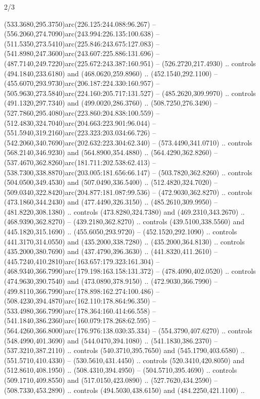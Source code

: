 \begin{flagdescription}{2/3}
\begin{scope}[xshift=0.5\flaglength,yshift=0.5\flagwidth,scale=\flagwidth/638.38]
\begin{scope}[y=0.80pt, x=0.80pt, yscale=-1,shift={(-600,-400)}]
\begin{scope}[shift={(-0.02,2.173)}]
  (533.3680,295.3750)arc(226.125:244.088:96.267) --
  (556.2060,274.7090)arc(243.994:226.135:100.638) --
  (511.5350,273.5410)arc(225.846:243.675:127.083) --
  (541.8980,247.3600)arc(243.607:225.886:131.696) --
  (487.7140,249.7220)arc(225.672:243.387:160.951) -- (526.2720,217.4930) ..
  controls (494.1840,233.6180) and (468.0620,259.8960) .. (452.1540,292.1100) --
  (455.6070,293.9730)arc(206.187:224.330:160.957) --
  (505.9630,273.5840)arc(224.160:205.717:131.527) -- (485.2620,309.9970) ..
  controls (491.1320,297.7340) and (499.0020,286.3760) .. (508.7250,276.3490) --
  (527.7860,295.4080)arc(223.860:204.838:100.559) --
  (512.4830,324.7040)arc(204.663:223.901:96.044) --
  (551.5940,319.2160)arc(223.323:203.034:66.726) --
  (542.2060,340.7690)arc(202.632:223.304:62.340) -- (573.4490,341.0710) ..
  controls (568.2140,346.9230) and (564.8900,354.4880) .. (564.4290,362.8260) --
  (537.4670,362.8260)arc(181.711:202.538:62.413) --
  (538.7300,338.8870)arc(203.005:181.656:66.147) -- (503.7820,362.8260) ..
  controls (504.0500,349.4530) and (507.0490,336.5400) .. (512.4820,324.7020) --
  (509.0340,322.8420)arc(204.877:181.087:99.536) -- (472.9030,362.8270) ..
  controls (473.1860,344.2430) and (477.4490,326.3150) .. (485.2610,309.9950) --
  (481.8220,308.1380) .. controls (473.8280,324.7380) and (469.2310,343.2670) ..
  (468.9390,362.8270) -- (439.2180,362.8270) .. controls (439.5100,338.5560) and
  (445.1820,315.1690) .. (455.6050,293.9720) -- (452.1520,292.1090) .. controls
  (441.3170,314.0550) and (435.2000,338.7280) .. (435.2000,364.8130) .. controls
  (435.2000,380.7690) and (437.4790,396.3630) .. (441.8320,411.2610) --
  (445.7240,410.2810)arc(163.657:179.323:161.304) --
  (468.9340,366.7990)arc(179.198:163.158:131.372) -- (478.4090,402.0520) ..
  controls (474.9630,390.7540) and (473.0890,378.9150) .. (472.9030,366.7990) --
  (499.8110,366.7990)arc(178.898:162.274:100.486) --
  (508.4230,394.4870)arc(162.110:178.864:96.350) --
  (533.4980,366.7990)arc(178.364:160.414:66.558) --
  (541.1840,386.2360)arc(160.079:178.268:62.595) --
  (564.4260,366.8000)arc(176.976:138.030:35.334) -- (554.3790,407.6270) ..
  controls (548.4990,401.3690) and (544.0470,394.1080) .. (541.1830,386.2370) --
  (537.3210,387.2110) .. controls (540.3710,395.7650) and (545.1790,403.6580) ..
  (551.5710,410.4330) -- (530.5610,431.4450) .. controls (520.3410,420.8050) and
  (512.8610,408.1950) .. (508.4310,394.4950) -- (504.5710,395.4690) .. controls
  (509.1710,409.8550) and (517.0150,423.0890) .. (527.7620,434.2590) --
  (508.7330,453.2890) .. controls (494.5030,438.6150) and (484.2250,421.1100) ..

\end{scope}
\end{scope}
\end{scope}
\end{flagdescription}

